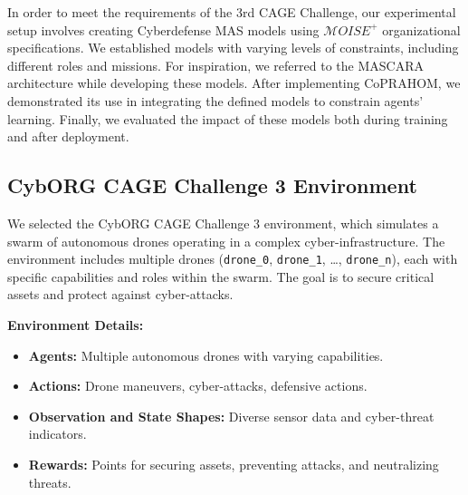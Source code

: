 \documentclass[conference]{IEEEtran}
\begin{document}
In order to meet the requirements of the 3rd CAGE Challenge, our experimental setup involves creating Cyberdefense MAS models using $\mathcal{M}OISE^+$ organizational specifications. We established models with varying levels of constraints, including different roles and missions. For inspiration, we referred to the MASCARA architecture while developing these models. After implementing CoPRAHOM, we demonstrated its use in integrating the defined models to constrain agents' learning. Finally, we evaluated the impact of these models both during training and after deployment.

\subsection{CybORG CAGE Challenge 3 Environment}

We selected the CybORG CAGE Challenge 3 environment, which simulates a swarm of autonomous drones operating in a complex cyber-infrastructure. The environment includes multiple drones (\texttt{drone\_0}, \texttt{drone\_1}, \ldots, \texttt{drone\_n}), each with specific capabilities and roles within the swarm. The goal is to secure critical assets and protect against cyber-attacks.

\textbf{Environment Details:}
\begin{itemize}
    \item \textbf{Agents:} Multiple autonomous drones with varying capabilities.
    \item \textbf{Actions:} Drone maneuvers, cyber-attacks, defensive actions.
    \item \textbf{Observation and State Shapes:} Diverse sensor data and cyber-threat indicators.
    \item \textbf{Rewards:} Points for securing assets, preventing attacks, and neutralizing threats.
\end{itemize}
\end{document}

